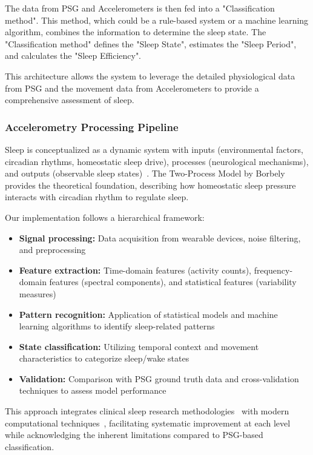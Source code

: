 \documentclass[conference]{IEEEtran}
\begin{document}
The data from PSG and Accelerometers is then fed into a "Classification method". This method, which could be a rule-based system or a machine learning algorithm, combines the information to determine the sleep state. The "Classification method" defines the "Sleep State", estimates the "Sleep Period", and calculates the "Sleep Efficiency".

This architecture allows the system to leverage the detailed physiological data from PSG and the movement data from Accelerometers to provide a comprehensive assessment of sleep.
\subsubsection{Accelerometry Processing Pipeline}

Sleep is conceptualized as a dynamic system with inputs (environmental factors, circadian rhythms, homeostatic sleep drive), processes (neurological mechanisms), and outputs (observable sleep states)~\cite{carskadon2005normal, borbely1982}. The Two-Process Model by Borbely~\cite{borbely1982} provides the theoretical foundation, describing how homeostatic sleep pressure interacts with circadian rhythm to regulate sleep.

Our implementation follows a hierarchical framework:
\begin{itemize}
	\item \textbf{Signal processing:} Data acquisition from wearable devices, noise filtering, and preprocessing~\cite{ancoli2003role, vanHees2015}
	\item \textbf{Feature extraction:} Time-domain features (activity counts), frequency-domain features (spectral components), and statistical features (variability measures)~\cite{sadeh1994activity, kushida2001}
	\item \textbf{Pattern recognition:} Application of statistical models and machine learning algorithms to identify sleep-related patterns~\cite{zhang2020machine, behar2013}
	\item \textbf{State classification:} Utilizing temporal context and movement characteristics to categorize sleep/wake states~\cite{rechtschaffen1968, littner2003}
	\item \textbf{Validation:} Comparison with PSG ground truth data and cross-validation techniques to assess model performance~\cite{kushida2001, sadeh2011}
\end{itemize}

This approach integrates clinical sleep research methodologies~\cite{aasm2007, littner2003} with modern computational techniques~\cite{zhang2020machine, behar2013}, facilitating systematic improvement at each level while acknowledging the inherent limitations compared to PSG-based classification.
\end{document}
